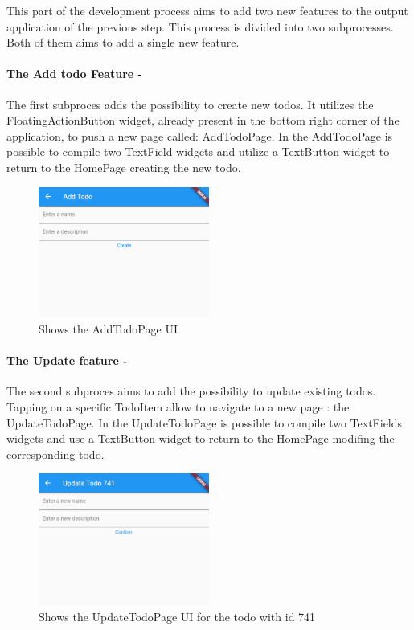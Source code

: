 

This part of the development process aims to add two new features to the output application of the previous step. This process is divided into two subprocesses. Both of them aims to add a single new feature.

\paragraph{The Add todo Feature - }
\label{par:add_todo_feature}
The first subproces adds the possibility to create new todos. It utilizes the FloatingActionButton widget, already present in the bottom right corner of the application, to push a new page called: AddTodoPage. In the AddTodoPage is possible to compile two TextField widgets and utilize a TextButton widget to return to the HomePage creating the new todo.
 

\begin{figure}[H]
    \centering
    \includegraphics[width=0.5\textwidth]{Images/shot_runtime_todoapp_addpage.png}
    \caption{Shows the AddTodoPage UI}
    \label{fig:add_todo_page_tree_structure}
\end{figure}
\paragraph{The Update feature - }
\label{par:update_todo_feature}
The second subproces aims to add the possibility to update existing todos. Tapping on a specific TodoItem allow to navigate to a new page : the UpdateTodoPage. In the UpdateTodoPage is possible to compile two TextFields widgets and use a TextButton widget to return to the HomePage modifing the corresponding todo.

\begin{figure}[H]
    \centering
    \includegraphics[width=0.5\textwidth]{Images/shot_runtime_todoapp_updatepage.png}
    \caption{Shows the UpdateTodoPage UI for the todo with id 741}
    \label{fig:add_todo_page_tree_structure}
\end{figure}